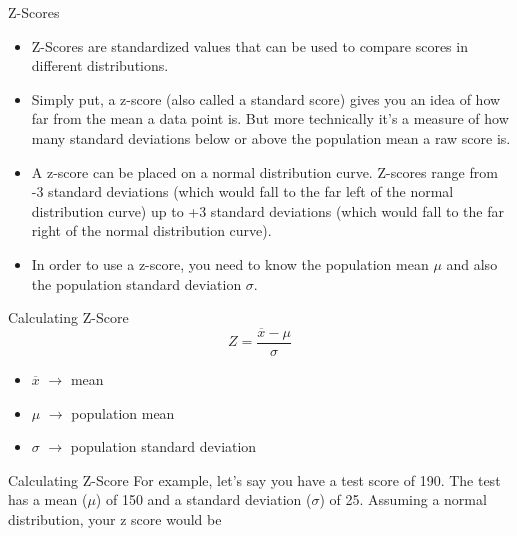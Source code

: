 \begin{frame}[t]{Z-Scores}
	\begin{itemize}
		\item Z-Scores are standardized values that can be used to compare 
		scores in different distributions.
		\item Simply put, a z-score (also called a standard score) gives you an 
		idea of how far from the mean a data point is. But more technically 
		it’s a measure of how many standard deviations below or above the 
		population mean a raw score is.
		\item A z-score can be placed on a normal distribution curve. Z-scores 
		range from -3 standard deviations (which would fall to the far left of 
		the normal distribution curve) up to +3 standard deviations (which 
		would fall to the far right of the normal distribution curve). 
		\item In order 
		to use a z-score, you need to know the population mean $\mu$ and also 
		the 
		population standard deviation $\sigma$.
	\end{itemize}

\end{frame}

\begin{frame}[t]{Calculating Z-Score}
	$$
	Z = \frac{\overline{x}-\mu}{\sigma}
	$$
	
	\begin{itemize}
		\item $\overline{x}$ $\rightarrow$ mean 
		\item $\mu$ $\rightarrow$ population mean 
		\item $\sigma$ $\rightarrow$ population standard deviation
	\end{itemize}
\end{frame}


\begin{frame}[t]{Calculating Z-Score}
	For example, let’s say you have a test score of 190. The test has a mean 
	($\mu$) of 150 and a standard deviation ($\sigma$) of 25. Assuming a normal 
	distribution, your z score would be
	
\end{frame}


